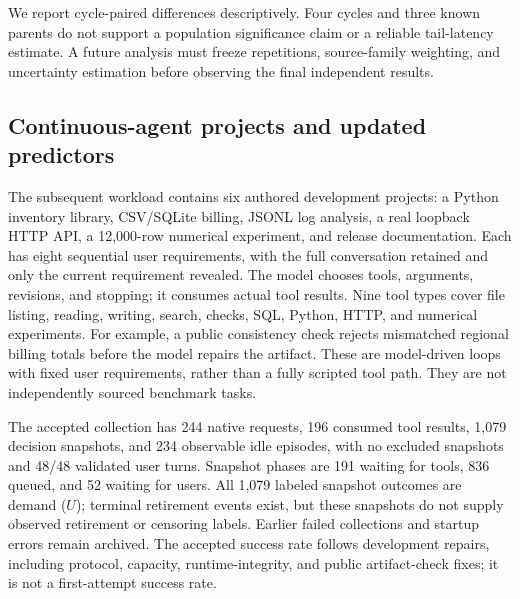 \documentclass[sigconf, screen, review, balance=false]{acmart}
\begin{document}
We report cycle-paired differences descriptively. Four cycles and three
known parents do not support a population significance claim or a
reliable tail-latency estimate. A future analysis must freeze
repetitions, source-family weighting, and uncertainty estimation before
observing the final independent results.


\subsection{Continuous-agent projects and updated predictors}
\label{continuous-setup}

The subsequent workload contains six authored development projects:
a Python inventory library, CSV/SQLite billing, JSONL log analysis,
a real loopback HTTP API, a 12,000-row numerical experiment, and release
documentation. Each has eight sequential user requirements, with the
full conversation retained and only the current requirement revealed.
The model chooses tools, arguments, revisions, and stopping; it consumes
actual tool results. Nine tool types cover file listing, reading,
writing, search, checks, SQL, Python, HTTP, and numerical experiments.
For example, a public consistency check rejects mismatched regional
billing totals before the model repairs the artifact. These are
model-driven loops with fixed user requirements, rather than a fully
scripted tool path. They are not independently sourced benchmark tasks.

The accepted collection has 244 native requests, 196 consumed tool
results, 1,079 decision snapshots, and 234 observable idle episodes,
with no excluded snapshots and 48/48 validated user turns. Snapshot
phases are 191 waiting for tools, 836 queued, and 52 waiting for users.
All 1,079 labeled snapshot outcomes are demand (\(U\)); terminal
retirement events exist, but these snapshots do not supply observed
retirement or censoring labels. Earlier failed collections and startup
errors remain archived. The accepted success rate follows development
repairs, including protocol, capacity, runtime-integrity, and public
artifact-check fixes; it is not a first-attempt success rate.
\end{document}
